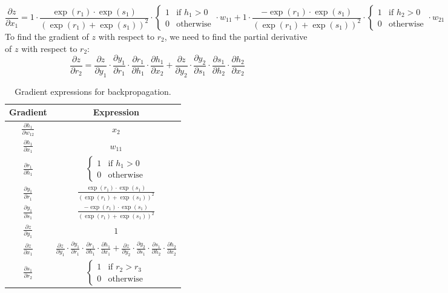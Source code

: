 \documentclass[a3paper,12pt]{extarticle} %
\begin{document}
\begin{enumerate}
\begin{enumerate}
\[\]
\[
\frac{\partial z}{\partial x_1} = 1 \cdot \frac{\exp(r_1) \cdot \exp(s_1)}{(\exp(r_1) + \exp(s_1))^2} \cdot \begin{cases} 1 & \text{if } h_1 > 0 \\ 0 & \text{otherwise} \end{cases} \cdot w_{11} + 1 \cdot \frac{-\exp(r_1) \cdot \exp(s_1)}{(\exp(r_1) + \exp(s_1))^2} \cdot \begin{cases} 1 & \text{if } h_2 > 0 \\ 0 & \text{otherwise} \end{cases} \cdot w_{21}
\]
To find the gradient of $z$ with respect to $r_2$, we need to find the partial derivative of $z$ with respect to $r_2$:
\[
\frac{\partial z}{\partial r_2} = \frac{\partial z}{\partial y_1} \cdot \frac{\partial y_1}{\partial r_1} \cdot \frac{\partial r_1}{\partial h_1} \cdot \frac{\partial h_1}{\partial x_2} + \frac{\partial z}{\partial y_2} \cdot \frac{\partial y_2}{\partial s_1} \cdot \frac{\partial s_1}{\partial h_2} \cdot \frac{\partial h_2}{\partial x_2}
\]


\begin{table}[h!]
\centering
\begin{tabular}{|c|c|}
\hline
\textbf{Gradient} & \textbf{Expression} \\ \hline
$\frac{\partial h_1}{\partial w_{12}}$ & $x_2$ \\ \hline
$\frac{\partial h_1}{\partial x_1}$ & $w_{11}$ \\ \hline
$\frac{\partial r_1}{\partial h_1}$ & $\begin{cases} 1 & \text{if } h_1 > 0 \\ 0 & \text{otherwise} \end{cases}$ \\ \hline
$\frac{\partial y_1}{\partial r_1}$ & $\frac{\exp(r_1) \cdot \exp(s_1)}{(\exp(r_1) + \exp(s_1))^2}$ \\ \hline
$\frac{\partial y_1}{\partial s_1}$ & $\frac{-\exp(r_1) \cdot \exp(s_1)}{(\exp(r_1) + \exp(s_1))^2}$ \\ \hline
$\frac{\partial z}{\partial y_1}$ & $1$ \\ \hline
$\frac{\partial z}{\partial x_1}$ &  $\frac{\partial z}{\partial y_1} \cdot \frac{\partial y_1}{\partial r_1} \cdot \frac{\partial r_1}{\partial h_1} \cdot \frac{\partial h_1}{\partial x_1} + \frac{\partial z}{\partial y_2} \cdot \frac{\partial y_2}{\partial s_1} \cdot \frac{\partial s_1}{\partial h_2} \cdot \frac{\partial h_2}{\partial x_2}$\\ \hline
$\frac{\partial s_1}{\partial r_2}$ & $\begin{cases} 1 & \text{if } r_2 > r_3 \\ 0 & \text{otherwise} \end{cases}$ \\ \hline
\end{tabular}
\caption{Gradient expressions for backpropagation.}
\label{table:gradients}
\end{table}

\end{enumerate}

\end{enumerate}
\newpage
\end{document}
